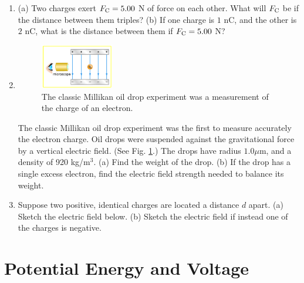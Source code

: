 \documentclass[10pt]{article}
\begin{document}
\begin{enumerate}
\item (a) Two charges exert $F_{\rm C} = 5.00$ N of force on each other. What will $F_{\rm C}$ be if the distance between them triples? (b) If one charge is $1$ nC, and the other is $2$ nC, what is the distance between them if $F_{\rm C} = 5.00$ N? \\ \vspace{1cm}
\item 
\begin{figure}
\centering
\includegraphics[width=0.3\textwidth]{figures/mill.jpeg}
\caption{\label{fig:mill} The classic Millikan oil drop experiment was a measurement of the charge of an electron.}
\end{figure}
The classic Millikan oil drop experiment was the first to measure accurately the electron charge. Oil drops were suspended against the gravitational force by a vertical electric field. (See Fig. \ref{fig:mill}.) The drops have radius $1.0 \mu$m, and a density of 920 kg/m$^3$. (a) Find the weight of the drop. (b) If the drop has a single excess electron, find the electric field strength needed to balance its weight. \\ \vspace{1.75cm}
\item Suppose two positive, identical charges are located a distance $d$ apart. (a) Sketch the electric field below.  (b) Sketch the electric field if instead one of the charges is negative. \\ \vspace{2.5cm}
\end{enumerate}

\section{Potential Energy and Voltage}
\end{document}
